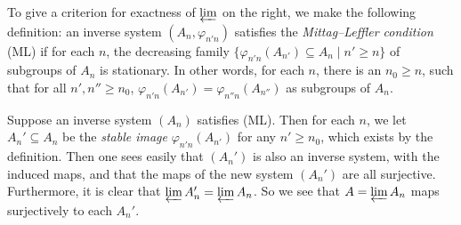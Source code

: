 {To give a criterion for exactness of $\varprojlim$ on the right, we make the following definition: an inverse system $(A_n,\varphi_{n'n})$ satisfies the \emph{Mittag--Leffler condition} (ML) if for each $n$, the decreasing family $\{\varphi_{n'n}(A_{n'})\subseteq A_n\mid n'\ge n\}$ of subgroups of $A_n$ is stationary. In other words, for each $n$, there is an $n_0\ge n$, such that for all $n',n''\ge n_0$, $\varphi_{n'n}(A_{n'})=\varphi_{n''n}(A_{n''})$ as subgroups of $A_n$.

Suppose an inverse system $(A_n)$ satisfies (ML). Then for each $n$, we let $A_n'\subseteq A_n$ be the \emph{stable image} $\varphi_{n'n}(A_{n'})$ for any $n'\ge n_0$, which exists by the definition. Then one sees easily that $(A_n')$ is also an inverse system, with the induced maps, and that the maps of the new system $(A_n')$ are all surjective. Furthermore, it is clear that $\varprojlim A_n'=\varprojlim A_n$. So we see that $A=\varprojlim A_n$ maps surjectively to each $A_n'$.}
